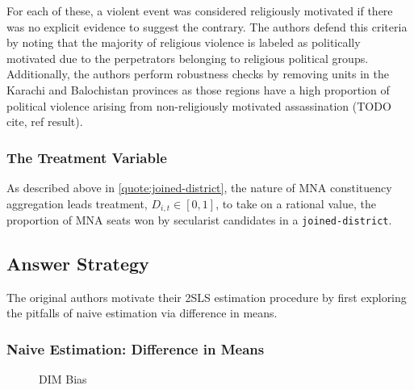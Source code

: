 \documentclass{scrartcl}
\begin{document}
For each of these, a violent event was considered religiously motivated if there was no explicit evidence to suggest the contrary.
The authors defend this criteria by noting that the majority of religious violence is labeled as politically motivated due to the perpetrators belonging to religious political groups.
Additionally, the authors perform robustness checks by removing units in the Karachi and Balochistan provinces as those regions have a high proportion of political violence arising from non-religiously motivated assassination (TODO cite, ref result). 

\subsubsection{The Treatment Variable} \label{treatment}

As described above in \ref{quote:joined-district}, the nature of MNA constituency aggregation leads treatment, $D_{i,t} \in [0, 1]$, to take on a rational value, the proportion of MNA seats won by secularist candidates in a \texttt{joined-district}.

\subsection{Answer Strategy} \label{id}

The original authors motivate their 2SLS estimation procedure by first exploring the pitfalls of naive estimation via difference in means.

\subsubsection{Naive Estimation: Difference in Means} \label{dim}

\begin{figure}[h]
  \centering
  \caption{DIM Bias}
  \label{fig:ate_dim}
\end{figure}
\end{document}
